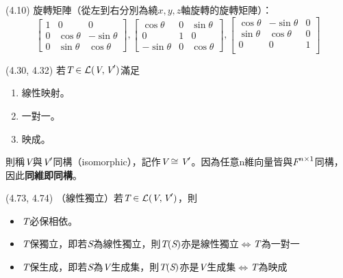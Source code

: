 \item \begin{theorem}{(4.10)} 旋轉矩陣（從左到右分別為繞$x, y, z$軸旋轉的旋轉矩陣）：
	\begin{equation}
		{\left[ 
		\begin{array}{ccc}
			1 & 0 & 0 \\
			0 & \cos\theta & -\sin\theta \\
			0 & \sin\theta & \cos\theta
		\end{array} 
		\right]},
		{\left[ 
		\begin{array}{ccc}
			\cos\theta & 0 & \sin\theta \\
			0 & 1 & 0 \\
			-\sin\theta & 0 & \cos\theta
		\end{array} 
		\right]},
		{\left[ 
		\begin{array}{ccc}
			\cos\theta & -\sin\theta & 0 \\
			\sin\theta & \cos\theta & 0 \\
			0 & 0 & 1 \\
		\end{array} 
		\right]}
	\end{equation}
\end{theorem}

\item \begin{theorem}{(4.30, 4.32)} 若$\textit{T} \in \mathcal{L}(\textit{V}, \textit{V}')$滿足
	\begin{enumerate}
		\item 線性映射。
		\item 一對一。
		\item 映成。
	\end{enumerate}
	則稱$\textit{V}$與$\textit{V}'$同構（isomorphic），記作$\textit{V} \cong \textit{V}'$。因為任意n維向量皆與$\textit{F}^{n \times 1}$同構，因此\textbf{同維即同構}。
\end{theorem}

\item \begin{theorem}{(4.73, 4.74)} （線性獨立）若$\textit{T} \in \mathcal{L}(\textit{V}, \textit{V}')$，則
	\begin{itemize}
		\item $\textit{T}$必保相依。
		\item $\textit{T}$保獨立，即若$\textit{S}$為線性獨立，則$\textit{T}(\textit{S})$亦是線性獨立$\iff$$\textit{T}$為一對一
		\item $\textit{T}$保生成，即若$\textit{S}$為$\textit{V}$生成集，則$\textit{T}(\textit{S})$亦是$\textit{V}$生成集$\iff$$\textit{T}$為映成
	\end{itemize}
\end{theorem}

